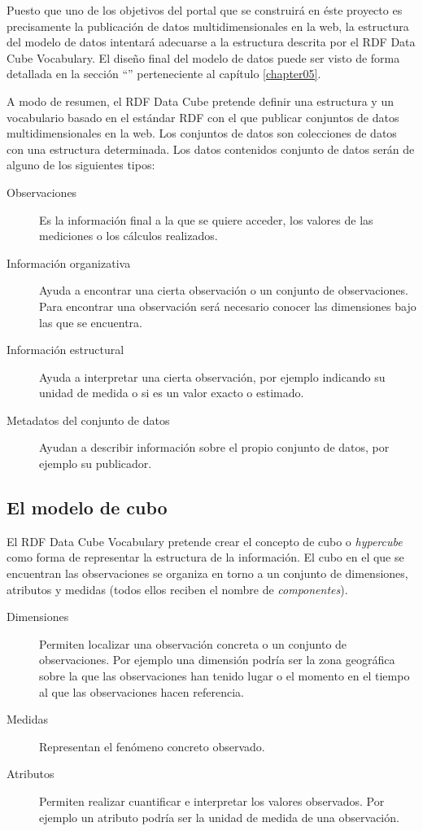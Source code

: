 Puesto que uno de los objetivos del portal que se construirá en éste proyecto es precisamente la publicación de datos multidimensionales en la web, la estructura del modelo de datos intentará adecuarse a la estructura descrita por el RDF Data Cube Vocabulary.  El diseño final del modelo de datos puede ser visto de forma detallada en la sección ``'' perteneciente al capítulo \ref{chapter05}.

A modo de resumen, el RDF Data Cube pretende definir una estructura y un vocabulario basado en el estándar RDF con el que publicar conjuntos de datos multidimensionales en la web.  Los conjuntos de datos son colecciones de datos con una estructura determinada.  Los datos contenidos conjunto de datos serán de alguno de los siguientes tipos:
\begin{description}
\item[Observaciones]  Es la información final a la que se quiere acceder, los valores de las mediciones o los cálculos realizados.
\item[Información organizativa]  Ayuda a encontrar una cierta observación o un conjunto de observaciones.  Para encontrar una observación será necesario conocer las dimensiones bajo las que se encuentra.
\item[Información estructural]   Ayuda a interpretar una cierta observación, por ejemplo indicando su unidad de medida o si es un valor exacto o estimado.
\item[Metadatos del conjunto de datos]  Ayudan a describir información sobre el propio conjunto de datos, por ejemplo su publicador.
\end{description}

\subsection{El modelo de cubo}
El RDF Data Cube Vocabulary pretende crear el concepto de cubo o \textit{hypercube} como forma de representar la estructura de la información. El cubo en el que se encuentran las observaciones se organiza en torno a un conjunto de dimensiones, atributos y medidas (todos ellos reciben el nombre de \textit{componentes}).
\begin{description}
\item[Dimensiones]  Permiten localizar una observación concreta o un conjunto de observaciones.  Por ejemplo una dimensión podría ser la zona geográfica sobre la que las observaciones han tenido lugar o el momento en el tiempo al que las observaciones hacen referencia.
\item[Medidas]  Representan el fenómeno concreto observado.
\item[Atributos]  Permiten realizar cuantificar e interpretar los valores observados.  Por ejemplo un atributo podría ser la unidad de medida de una observación.
\end{description}

